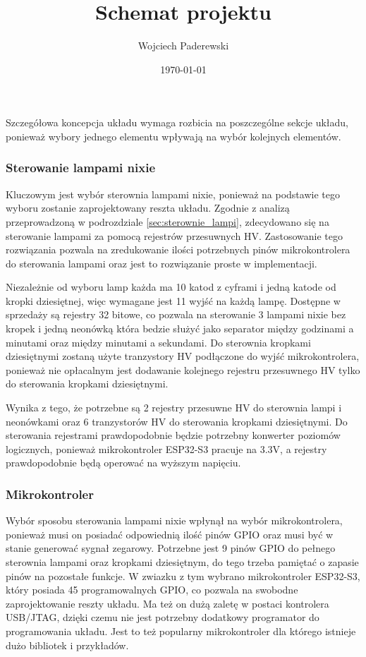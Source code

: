 \documentclass[../main.tex]{subfiles}
\author{Wojciech Paderewski}
\date{\today}
\title{Schemat projektu}
\begin{document}
Szczegółowa koncepcja układu wymaga rozbicia na poszczególne sekcje układu, ponieważ wybory jednego elementu wpływają na wybór kolejnych elementów.

\subsubsection{Sterowanie lampami nixie}
Kluczowym jest wybór sterownia lampami nixie, ponieważ na podstawie tego wyboru zostanie zaprojektowany reszta układu.
Zgodnie z analizą przeprowadzoną w podrozdziale \ref{sec:sterownie_lampi}, zdecydowano się na sterowanie lampami za pomocą rejestrów przesuwnych HV.
Zastosowanie tego rozwiązania pozwala na zredukowanie ilości potrzebnych pinów mikrokontrolera do sterowania lampami oraz jest to rozwiązanie proste w implementacji.

Niezależnie od wyboru lamp każda ma 10 katod z cyframi i jedną katode od kropki dziesiętnej, więc wymagane jest 11 wyjść na każdą lampę.
Dostępne w sprzedaży są rejestry 32 bitowe, co pozwala na sterowanie 3 lampami nixie bez kropek i jedną neonówką która bedzie
służyć jako separator między godzinami a minutami oraz między minutami a sekundami. Do sterownia kropkami dziesiętnymi zostaną użyte tranzystory HV podłączone do wyjść mikrokontrolera,
ponieważ nie opłacalnym jest dodawanie kolejnego rejestru przesuwnego HV tylko do sterowania kropkami dziesiętnymi.

Wynika z tego, że potrzebne są 2 rejestry przesuwne HV do sterownia lampi i neonówkami oraz 6 tranzystorów HV do sterowania kropkami dziesiętnymi.
Do sterowania rejestrami prawdopodobnie będzie potrzebny konwerter poziomów logicznych, ponieważ mikrokontroler ESP32-S3 pracuje na 3.3V, a rejestry prawdopodobnie będą operować na wyższym napięciu.
\subsubsection{Mikrokontroler}
Wybór sposobu sterowania lampami nixie wpłynął na wybór mikrokontrolera, ponieważ musi on posiadać odpowiednią ilość pinów GPIO oraz musi być w stanie generować sygnał zegarowy.
Potrzebne jest 9 pinów GPIO do pełnego sterownia lampami oraz kropkami dziesiętnym, do tego trzeba pamiętać o zapasie pinów na pozostałe funkcje. W zwiazku z tym
wybrano mikrokontroler ESP32-S3, który posiada 45 programowalnych GPIO, co pozwala na swobodne zaprojektowanie reszty układu. Ma też on dużą zaletę w postaci kontrolera USB/JTAG,
dzięki czemu nie jest potrzebny dodatkowy programator do programowania układu. Jest to też popularny mikrokontroler dla którego istnieje dużo bibliotek i przykładów.
\end{document}
